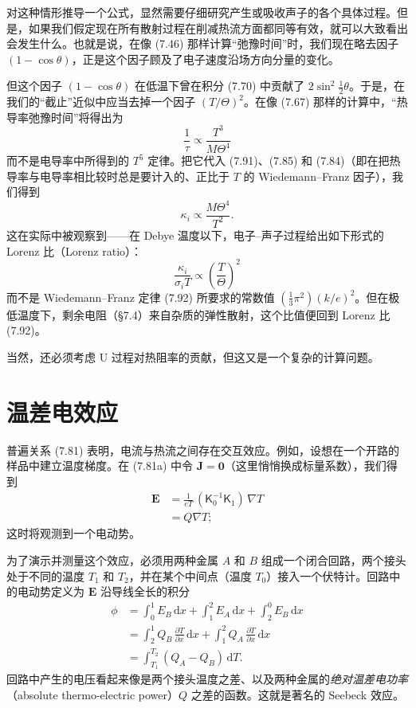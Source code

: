 对这种情形推导一个公式，显然需要仔细研究产生或吸收声子的各个具体过程。但是，如果我们假定现在所有散射过程在削减热流方面都同等有效，就可以大致看出会发生什么。也就是说，在像 (7.46) 那样计算“弛豫时间”时，我们现在略去因子 $(1-\cos\theta)$，正是这个因子顾及了电子速度沿场方向分量的变化。

但这个因子 $(1-\cos\theta)$ 在低温下曾在积分 (7.70) 中贡献了 $2\sin^{2}\frac{1}{2}\theta$。于是，在我们的“截止”近似中应当去掉一个因子 $(T/\Theta)^{2}$。在像 (7.67) 那样的计算中，“热导率弛豫时间”将得出为
\begin{equation*}
\frac{1}{\tau}\propto\frac{T^{3}}{M\Theta^{4}}\tag{7.96}
\end{equation*}
而不是电导率中所得到的 $T^{5}$ 定律。把它代入 (7.91)、(7.85) 和 (7.84)（即在把热导率与电导率相比较时总是要计入的、正比于 $T$ 的 Wiedemann--Franz 因子），我们得到
\begin{equation*}
\kappa_{i}\propto\frac{M\Theta^{4}}{T^{2}}.\tag{7.97}
\end{equation*}
这在实际中被观察到——在 Debye 温度以下，电子--声子过程给出如下形式的 Lorenz 比（Lorenz ratio）：
\begin{equation*}
\frac{\kappa_{i}}{\sigma_{i}T}\propto\left(\frac{T}{\Theta}\right)^{2}\tag{7.98}
\end{equation*}
而不是 Wiedemann--Franz 定律 (7.92) 所要求的常数值 $(\tfrac{1}{3}\pi^{2})(k/e)^{2}$。但在极低温度下，剩余电阻（§7.4）来自杂质的弹性散射，这个比值便回到 Lorenz 比 (7.92)。

当然，还必须考虑 U 过程对热阻率的贡献，但这又是一个复杂的计算问题。

\section{温差电效应}

普遍关系 (7.81) 表明，电流与热流之间存在交互效应。例如，设想在一个开路的样品中建立温度梯度。在 (7.81a) 中令 $\mathbf{J}=\mathbf{0}$（这里悄悄换成标量系数），我们得到
\begin{align*}
\mathbf{E}&=\frac{1}{eT}\,(\mathsf{K}_{0}^{-1}\mathsf{K}_{1})\,\nabla T\\
&=Q\nabla T;\tag{7.99}
\end{align*}
这时将观测到一个电动势。

为了演示并测量这个效应，必须用两种金属 $A$ 和 $B$ 组成一个闭合回路，两个接头处于不同的温度 $T_{1}$ 和 $T_{2}$，并在某个中间点（温度 $T_{0}$）接入一个伏特计。回路中的电动势定义为 $\mathbf{E}$ 沿导线全长的积分
\begin{align*}
\phi&=\int_{0}^{1}E_{B}\,\mathrm{d}x+\int_{1}^{2}E_{A}\,\mathrm{d}x+\int_{2}^{0}E_{B}\,\mathrm{d}x\\
&=\int_{2}^{1}Q_{B}\,\frac{\partial T}{\partial x}\,\mathrm{d}x+\int_{1}^{2}Q_{A}\,\frac{\partial T}{\partial x}\,\mathrm{d}x\\
&=\int_{T_{1}}^{T_{2}}(Q_{A}-Q_{B})\,\mathrm{d}T.\tag{7.100}
\end{align*}
回路中产生的电压看起来像是两个接头温度之差、以及两种金属的\emph{绝对温差电功率}（absolute thermo-electric power）$Q$ 之差的函数。这就是著名的 Seebeck 效应。

